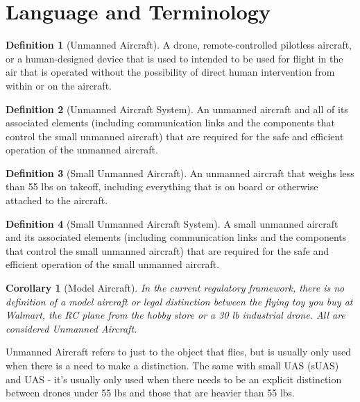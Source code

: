 \documentclass[
]{book}
\newtheorem{corollary}{Corollary}[chapter]
\theoremstyle{definition}
\newtheorem{definition}{Definition}[chapter]
\theoremstyle{definition}
\theoremstyle{definition}
\theoremstyle{definition}
\theoremstyle{remark}
\begin{document}
\hypertarget{language-and-terminology}{%
\section{Language and Terminology}\label{language-and-terminology}}

\begin{definition}[Unmanned Aircraft]
\protect\hypertarget{def:defUA}{}\label{def:defUA}A drone, remote-controlled pilotless aircraft, or a human-designed device that is used to intended to be used for flight in the air that is operated without the possibility of direct human intervention from within or on the aircraft.
\end{definition}

\begin{definition}[Unmanned Aircraft System]
\protect\hypertarget{def:defUAS}{}\label{def:defUAS}An unmanned aircraft and all of its associated elements (including communication links and the components that control the small unmanned aircraft) that are required for the safe and efficient operation of the unmanned aircraft.
\end{definition}

\begin{definition}[Small Unmanned Aircraft]
\protect\hypertarget{def:defSUA}{}\label{def:defSUA}An unmanned aircraft that weighs less than 55 lbs on takeoff, including everything that is on board or otherwise attached to the aircraft.
\end{definition}

\begin{definition}[Small Unmanned Aircraft System]
\protect\hypertarget{def:defSUAS}{}\label{def:defSUAS}A small unmanned aircraft and its associated elements (including communication links and the components that control the small unmanned aircraft) that are required for the safe and efficient operation of the small unmanned aircraft.
\end{definition}

\begin{corollary}[Model Aircraft]
\protect\hypertarget{cor:defMA}{}\label{cor:defMA}In the current regulatory framework, there is no definition of a model aircraft or legal distinction between the flying toy you buy at Walmart, the RC plane from the hobby store or a 30 lb industrial drone. All are considered Unmanned Aircraft.
\end{corollary}

Unmanned Aircraft refers to just to the object that flies, but is usually only used when there is a need to make a distinction. The same with small UAS (sUAS) and UAS - it's usually only used when there needs to be an explicit distinction between drones under 55 lbs and those that are heavier than 55 lbs.
\end{document}
